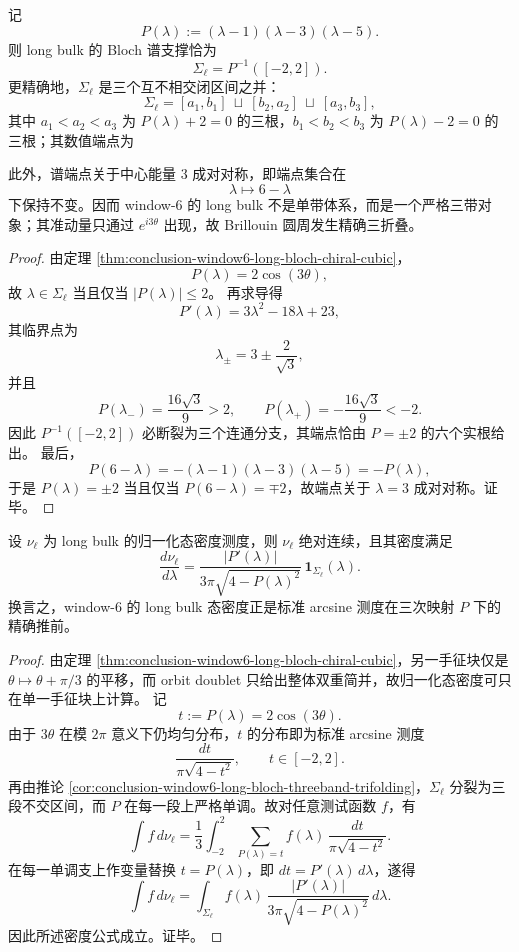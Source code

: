 \begin{corollary}\label{cor:conclusion-window6-long-bloch-threeband-trifolding}
记
\[
P(\lambda):=(\lambda-1)(\lambda-3)(\lambda-5).
\]
则 long bulk 的 Bloch 谱支撑恰为
\[
\Sigma_{\ell}=P^{-1}([-2,2]).
\]
更精确地，\(\Sigma_{\ell}\) 是三个互不相交闭区间之并：
\[
\Sigma_{\ell}=[a_1,b_1]\ \sqcup\ [b_2,a_2]\ \sqcup\ [a_3,b_3],
\]
其中 \(a_1<a_2<a_3\) 为 \(P(\lambda)+2=0\) 的三根，\(b_1<b_2<b_3\) 为 \(P(\lambda)-2=0\) 的三根；其数值端点为

此外，谱端点关于中心能量 \(3\) 成对对称，即端点集合在
\[
\lambda\longmapsto 6-\lambda
\]
下保持不变。因而 window-\(6\) 的 long bulk 不是单带体系，而是一个严格三带对象；其准动量只通过 \(e^{i3\theta}\) 出现，故 Brillouin 圆周发生精确三折叠。
\end{corollary}
\begin{proof}
由定理 \ref{thm:conclusion-window6-long-bloch-chiral-cubic}，
\[
P(\lambda)=2\cos(3\theta),
\]
故 \(\lambda\in\Sigma_{\ell}\) 当且仅当 \(|P(\lambda)|\le 2\)。
再求导得
\[
P'(\lambda)=3\lambda^2-18\lambda+23,
\]
其临界点为
\[
\lambda_{\pm}=3\pm \frac{2}{\sqrt3},
\]
并且
\[
P(\lambda_-)=\frac{16\sqrt3}{9}>2,
\qquad
P(\lambda_+)=-\frac{16\sqrt3}{9}<-2.
\]
因此 \(P^{-1}([-2,2])\) 必断裂为三个连通分支，其端点恰由 \(P=\pm2\) 的六个实根给出。
最后，
\[
P(6-\lambda)=-(\lambda-1)(\lambda-3)(\lambda-5)=-P(\lambda),
\]
于是 \(P(\lambda)=\pm2\) 当且仅当 \(P(6-\lambda)=\mp2\)，故端点关于 \(\lambda=3\) 成对对称。证毕。
\end{proof}

\begin{theorem}\label{thm:conclusion-window6-long-bloch-dos}
设 \(\nu_{\ell}\) 为 long bulk 的归一化态密度测度，则 \(\nu_{\ell}\) 绝对连续，且其密度满足
\[
\frac{d\nu_{\ell}}{d\lambda}
=
\frac{|P'(\lambda)|}{3\pi\sqrt{4-P(\lambda)^2}}\,
\mathbf 1_{\Sigma_{\ell}}(\lambda).
\]
换言之，window-\(6\) 的 long bulk 态密度正是标准 arcsine 测度在三次映射 \(P\) 下的精确推前。
\end{theorem}
\begin{proof}
由定理 \ref{thm:conclusion-window6-long-bloch-chiral-cubic}，另一手征块仅是 \(\theta\mapsto \theta+\pi/3\) 的平移，而 orbit doublet 只给出整体双重简并，故归一化态密度可只在单一手征块上计算。
记
\[
t:=P(\lambda)=2\cos(3\theta).
\]
由于 \(3\theta\) 在模 \(2\pi\) 意义下仍均匀分布，\(t\) 的分布即为标准 arcsine 测度
\[
\frac{dt}{\pi\sqrt{4-t^2}},
\qquad t\in[-2,2].
\]
再由推论 \ref{cor:conclusion-window6-long-bloch-threeband-trifolding}，\(\Sigma_{\ell}\) 分裂为三段不交区间，而 \(P\) 在每一段上严格单调。故对任意测试函数 \(f\)，有
\[
\int f\,d\nu_{\ell}
=
\frac13\int_{-2}^{2}
\sum_{P(\lambda)=t}f(\lambda)\,
\frac{dt}{\pi\sqrt{4-t^2}}.
\]
在每一单调支上作变量替换 \(t=P(\lambda)\)，即 \(dt=P'(\lambda)\,d\lambda\)，遂得
\[
\int f\,d\nu_{\ell}
=
\int_{\Sigma_{\ell}}
f(\lambda)\,
\frac{|P'(\lambda)|}{3\pi\sqrt{4-P(\lambda)^2}}\,d\lambda.
\]
因此所述密度公式成立。证毕。
\end{proof}

